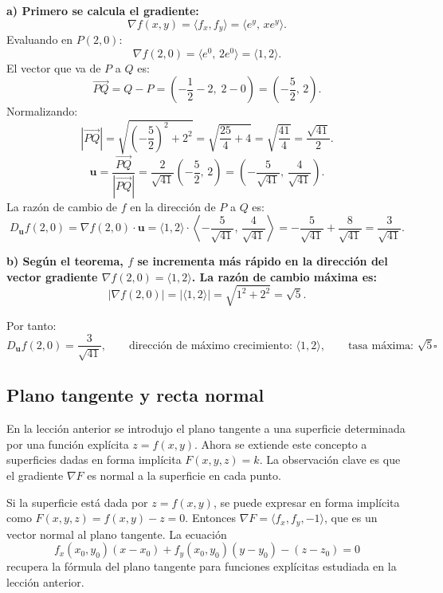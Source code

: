 \begin{myproof}
\textbf{a) Primero se calcula el gradiente:}
\[
\nabla f(x,y) = \langle f_x, f_y \rangle = \langle e^y,\, x e^y \rangle.
\]
Evaluando en $P(2,0)$:
\[
\nabla f(2,0) = \langle e^0,\, 2e^0 \rangle = \langle 1, 2 \rangle.
\]
El vector que va de $P$ a $Q$ es:
\[
\overrightarrow{PQ} = Q - P = \left(-\frac12 - 2,\; 2 - 0\right)
= \left(-\frac{5}{2},\, 2\right).
\]
Normalizando:
\[
\left|\overrightarrow{PQ}\right|
= \sqrt{\left(-\frac{5}{2}\right)^2 + 2^2}
= \sqrt{\frac{25}{4} + 4}
= \sqrt{\frac{41}{4}}
= \frac{\sqrt{41}}{2}.
\]
\[
\mathbf{u} = \frac{\overrightarrow{PQ}}{\left|\overrightarrow{PQ}\right|}
= \frac{2}{\sqrt{41}}\left(-\frac{5}{2},\, 2\right)
= \left(-\frac{5}{\sqrt{41}},\, \frac{4}{\sqrt{41}}\right).
\]
La razón de cambio de $f$ en la dirección de $P$ a $Q$ es:
\[
D_{\mathbf{u}} f(2,0)
= \nabla f(2,0)\cdot \mathbf{u}
= \langle 1,2\rangle \cdot
  \left\langle -\frac{5}{\sqrt{41}},\, \frac{4}{\sqrt{41}} \right\rangle
= -\frac{5}{\sqrt{41}} + \frac{8}{\sqrt{41}}
= \frac{3}{\sqrt{41}}.
\]

\textbf{b) Según el teorema, $f$ se incrementa más rápido en la dirección
del vector gradiente $\nabla f(2,0) = \langle 1,2\rangle$. La razón de
cambio máxima es:}
\[
|\nabla f(2,0)| = |\langle 1,2\rangle| = \sqrt{1^2 + 2^2} = \sqrt{5}.
\]

Por tanto:
\[
\boxed{D_{\mathbf{u}} f(2,0) = \frac{3}{\sqrt{41}},\qquad
\text{dirección de máximo crecimiento: } \langle 1,2\rangle,\qquad
\text{tasa máxima: } \sqrt{5}}.
\qquad\square
\]
\end{myproof}

\subsection{Plano tangente y recta normal}

En la lección anterior se introdujo el plano tangente a una superficie
determinada por una función explícita $z=f(x,y)$. Ahora se extiende este
concepto a superficies dadas en forma implícita $F(x,y,z)=k$. La
observación clave es que el gradiente $\nabla F$ es normal a la
superficie en cada punto.

\begin{rem}
Si la superficie está dada por $z=f(x,y)$, se puede expresar en forma
implícita como $F(x,y,z) = f(x,y) - z = 0$. Entonces
$\nabla F = \langle f_x, f_y, -1 \rangle$, que es un vector normal al
plano tangente. La ecuación
\[
f_x(x_0,y_0)(x-x_0) + f_y(x_0,y_0)(y-y_0) - (z-z_0) = 0
\]
recupera la fórmula del plano tangente para funciones explícitas
estudiada en la lección anterior.
\end{rem}

